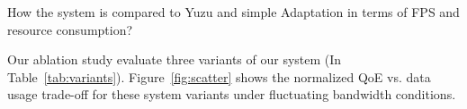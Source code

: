 \label{sec:eval-e2e}
How the system is compared to Yuzu and simple Adaptation in terms of FPS and resource consumption?




Our ablation study evaluate three variants of our system (In Table~\ref{tab:variants}). Figure~\ref{fig:scatter} shows the normalized QoE vs. data usage trade-off for these system variants under fluctuating bandwidth conditions.

